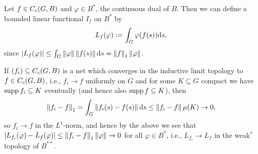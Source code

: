 \begin{definition}
	Let $f \in C_c(G,B)$ and $\varphi \in B^*$, the continuous dual of $B$. Then we can define a bounded linear functional $I_f$ on $B^*$ by
	\begin{align*}
		L_f(\varphi) := \int_G \varphi(f(s)) \mathrm{d} s,
	\end{align*}
	since $| L_f(\varphi)| \leq \int_G \left\lVert \varphi \right\rVert \left\lVert f(s) \right\rVert \mathrm{d} s = \left\lVert f \right\rVert_1 \left\lVert \varphi\right\rVert$.
\end{definition}
\begin{note}	
If $(f_i) \subseteq  C_c(G,B)$ is a net which converges in the inductive limit topology to $f \in C_c(G,B)$, i.e., $f_i \to f$ uniformly on $G$ and for some $K \subseteq G$ compact we have $\operatorname{supp} f_i \subseteq K$ eventually (and hence also $\operatorname{supp} f \subseteq K$), then
\begin{align*}
	\left\lVert f_i - f\right\rVert_1 = \int_{G} \left\lVert f_i(s) - f(s) \right\rVert \mathrm{d} s 	\leq \left\lVert f_i - f \right\rVert \mu(K) \to 0,
\end{align*}
so $f_i \to f$ in the $L^1$-norm, and hence by the above we see that $|L_{f_i}(\varphi) - L_f(\varphi) | \leq \left\lVert f_i-f\right\rVert_1 \left\lVert \varphi \right\rVert \to 0$ for all $ \varphi \in B^*$, i.e.,  $L_{f_i}\to L_f$ in the weak$^*$ topology of $B^{**}$.
\label{note:induct}
\end{note}


